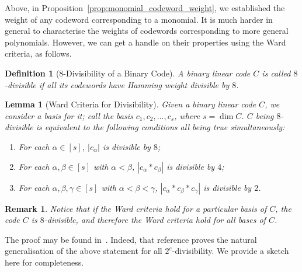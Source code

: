\documentclass{article}
\newcounter{main}[section]
\newtheorem{definition}[main]{Definition}
\newtheorem{lemma}[main]{Lemma}
\newtheorem{remark}[main]{Remark}
\begin{document}
Above, in Proposition~\ref{prop:monomial_codeword_weight}, we established the weight of any codeword corresponding to a monomial. It is much harder in general to characterise the weights of codewords corresponding to more general polynomials. However, we can get a handle on their properties using the Ward criteria, as follows.
\begin{definition}[$8$-Divisibility of a Binary Code]
    A binary linear code $C$ is called $8$-divisible if all its codewords have Hamming weight divisible by $8$.
\end{definition}
\begin{lemma}[Ward Criteria for Divisibility]\label{lemma:ward_criteria}
    Given a binary linear code $C$, we consider a basis for it; call the basis $c_1, c_2, \ldots, c_s$, where $s = \dim C$. $C$ being $8$-divisible is equivalent to the following conditions all being true simultaneously:
    \begin{enumerate}
        \item For each $\alpha \in [s]$, $|c_\alpha|$ is divisible by $8$;
        \item For each $\alpha,\beta \in [s]$ with $\alpha<\beta$, $|c_\alpha*c_\beta|$ is divisible by $4$;
        \item For each $\alpha,\beta,\gamma \in [s]$ with $\alpha < \beta < \gamma$, $|c_\alpha*c_\beta*c_\gamma|$ is divisible by $2$.
    \end{enumerate}
\end{lemma}
\begin{remark}
    Notice that if the Ward criteria hold for a particular basis of $C$, the code $C$ is $8$-divisible, and therefore the Ward criteria hold for all bases of $C$.
\end{remark}
The proof may be found in~\cite{ward1990weight}. Indeed, that reference proves the natural generalisation of the above statement for all $2^e$-divisibility. We provide a sketch here for completeness.
\end{document}
